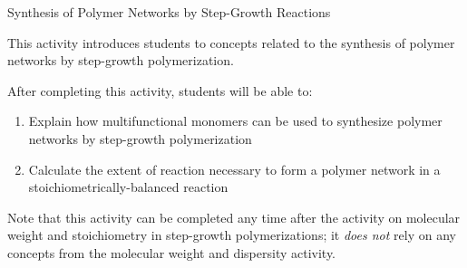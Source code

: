 %
%
%
%

\renewcommand{\figpath}{content/polymchem/networks/network-stepgrowth/figs}
\renewcommand{\labelbase}{network-stepgrowth}

\begin{activity}[extension]{Synthesis of Polymer Networks by Step-Growth Reactions}

\begin{instructornotes}
	This activity introduces students to concepts related to the synthesis of polymer networks by step-growth polymerization.
	
	After completing this activity, students will be able to:
	\begin{enumerate}
		\item Explain how multifunctional monomers can be used to synthesize polymer networks by step-growth polymerization
		\item Calculate the extent of reaction necessary to form a polymer network in a stoichiometrically-balanced reaction
	\end{enumerate}
	
	Note that this activity can be completed any time after the activity on molecular weight and stoichiometry in step-growth polymerizations; it \emph{does not} rely on any concepts from the molecular weight and dispersity activity.
	

\end{instructornotes}
\end{activity}
